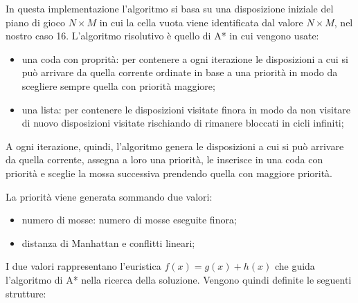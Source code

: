 In questa implementazione l'algoritmo si basa su una disposizione iniziale del piano di gioco $N\times M$ in cui la cella vuota viene identificata dal valore $N\times M$, nel nostro caso 16. 
L'algoritmo risolutivo è quello di A* in cui vengono usate: 
\begin{itemize}
    \item una coda con proprità: per contenere a ogni iterazione le disposizioni a cui si può arrivare da quella corrente ordinate in base a una priorità in modo da scegliere sempre quella con priorità maggiore; 
    \item una lista: per contenere le disposizioni visitate finora in modo da non visitare di nuovo disposizioni visitate rischiando di rimanere bloccati in cicli infiniti; 
\end{itemize}

A ogni iterazione, quindi, l'algoritmo genera le disposizioni a cui si può arrivare da quella corrente, assegna a loro una priorità, le inserisce in una coda con priorità e sceglie la mossa successiva prendendo quella con maggiore priorità.

La priorità viene generata sommando due valori: 
\begin{itemize}
    \item numero di mosse: numero di mosse eseguite finora; 
    \item distanza di Manhattan e conflitti lineari; 
\end{itemize} I due valori rappresentano l'euristica $f(x) = g(x) + h(x)$ che guida l'algoritmo di A* nella ricerca della soluzione. Vengono quindi definite le seguenti strutture: 

